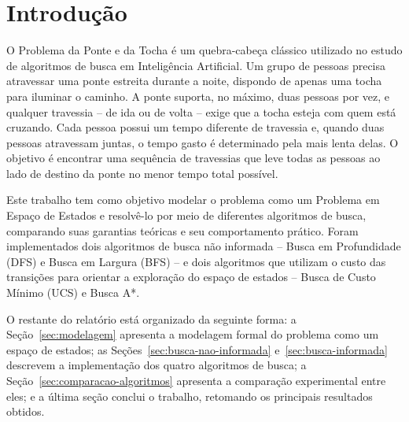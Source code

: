 \section{Introdução}
\label{sec:introducao}

O Problema da Ponte e da Tocha é um quebra-cabeça clássico utilizado no
estudo de algoritmos de busca em Inteligência Artificial. Um grupo de
pessoas precisa atravessar uma ponte estreita durante a noite, dispondo de
apenas uma tocha para iluminar o caminho. A ponte suporta, no máximo, duas
pessoas por vez, e qualquer travessia -- de ida ou de volta -- exige que a
tocha esteja com quem está cruzando. Cada pessoa possui um tempo diferente
de travessia e, quando duas pessoas atravessam juntas, o tempo gasto é
determinado pela mais lenta delas. O objetivo é encontrar uma sequência de
travessias que leve todas as pessoas ao lado de destino da ponte no menor
tempo total possível.

Este trabalho tem como objetivo modelar o problema como um Problema em
Espaço de Estados e resolvê-lo por meio de diferentes algoritmos de busca,
comparando suas garantias teóricas e seu comportamento prático. Foram
implementados dois algoritmos de busca não informada -- Busca em
Profundidade (DFS) e Busca em Largura (BFS) -- e dois algoritmos que
utilizam o custo das transições para orientar a exploração do espaço de
estados -- Busca de Custo Mínimo (UCS) e Busca A*.

O restante do relatório está organizado da seguinte forma: a
Seção~\ref{sec:modelagem} apresenta a modelagem formal do problema como um
espaço de estados; as Seções~\ref{sec:busca-nao-informada}
e~\ref{sec:busca-informada} descrevem a implementação dos quatro algoritmos
de busca; a Seção~\ref{sec:comparacao-algoritmos} apresenta a comparação
experimental entre eles; e a última seção conclui o trabalho, retomando os
principais resultados obtidos.
